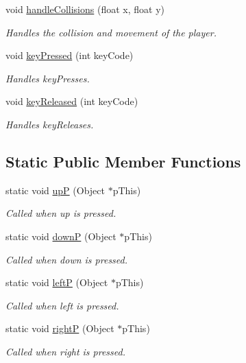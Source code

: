 \begin{DoxyCompactItemize}
void \hyperlink{class_b_player_a4c0f72ebb2a0b95eb35fab6598924992}{handle\-Collisions} (float x, float y)
\begin{DoxyCompactList}\small\item\em \-Handles the collision and movement of the player. \end{DoxyCompactList}\item 
void \hyperlink{class_b_player_ae0aaaa33013fd5c0070cf51619abf12b}{key\-Pressed} (int key\-Code)
\begin{DoxyCompactList}\small\item\em \-Handles key\-Presses. \end{DoxyCompactList}\item 
void \hyperlink{class_b_player_a8210db4e8fac75ace4b71b3ded1df6bf}{key\-Released} (int key\-Code)
\begin{DoxyCompactList}\small\item\em \-Handles key\-Releases. \end{DoxyCompactList}\end{DoxyCompactItemize}
\subsection*{\-Static \-Public \-Member \-Functions}
\begin{DoxyCompactItemize}
\item 
static void \hyperlink{class_b_player_ab01210df4dccd3ab9108bbffadad8243}{up\-P} (\-Object $\ast$p\-This)
\begin{DoxyCompactList}\small\item\em \-Called when up is pressed. \end{DoxyCompactList}\item 
static void \hyperlink{class_b_player_acbcd61303f7f7ccf57a70bbe7af5470f}{down\-P} (\-Object $\ast$p\-This)
\begin{DoxyCompactList}\small\item\em \-Called when down is pressed. \end{DoxyCompactList}\item 
static void \hyperlink{class_b_player_aea6f08c0d171c16acdf4180356f33732}{left\-P} (\-Object $\ast$p\-This)
\begin{DoxyCompactList}\small\item\em \-Called when left is pressed. \end{DoxyCompactList}\item 
static void \hyperlink{class_b_player_a715fb318e6a807cbf0822aa8b34e999b}{right\-P} (\-Object $\ast$p\-This)
\begin{DoxyCompactList}\small\item\em \-Called when right is pressed. \end{DoxyCompactList}\end{DoxyCompactItemize}


